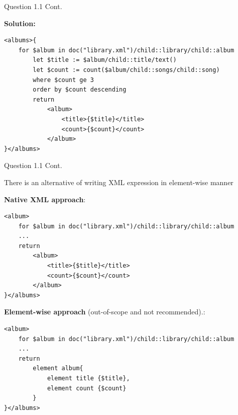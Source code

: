 \begin{frame}[fragile]{Question 1.1 Cont.}

\textbf{Solution:}
\begin{lstlisting}[style=xml-small]
<albums>{
	for $album in doc("library.xml")/child::library/child::album
		let $title := $album/child::title/text()
		let $count := count($album/child::songs/child::song)
		where $count ge 3
		order by $count descending
		return
			<album>
				<title>{$title}</title>
				<count>{$count}</count>
			</album>
}</albums>
\end{lstlisting}
\end{frame}

\begin{frame}[fragile]{Question 1.1 Cont.}
	
There is an alternative of writing XML expression in element-wise manner\\\vspace{5pt}

\textbf{Native XML approach}:
\begin{lstlisting}[style=xml-small-nomargin]
<album>
	for $album in doc("library.xml")/child::library/child::album
	...
	return
		<album>
			<title>{$title}</title>
			<count>{$count}</count>
		</album>
}</albums>
\end{lstlisting}


\textbf{Element-wise approach} (out-of-scope and not recommended).:
\begin{lstlisting}[style=xml-small-nomargin]
<album>
	for $album in doc("library.xml")/child::library/child::album
	...
	return
		element album{
			element title {$title},
			element count {$count}
		}
}</albums>
\end{lstlisting}

\end{frame}

